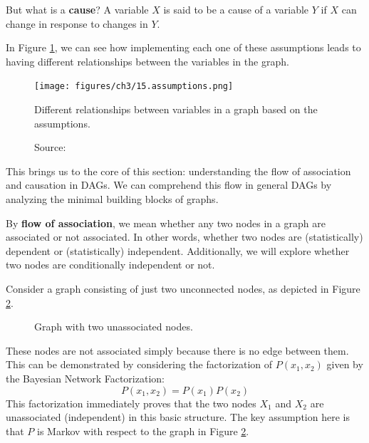 But what is a \textbf{cause}? A variable \( X \) is said to be a cause
of a variable \( Y \) if \( X \) can change in response to changes in \( Y \).

In Figure \ref{fig:assumptions}, we can see how implementing each one
of these assumptions leads to having different relationships
between the variables in the graph.

\begin{figure}[h]
    \centering
    \texttt{[image: figures/ch3/15.assumptions.png]}
    \caption{Different relationships between variables in a graph based on the assumptions.}
    \vspace{-10px}
    \caption*{\scriptsize{Source: \cite{Neal_2020a}}}
    \label{fig:assumptions}
\end{figure}

This brings us to the core of this section: understanding the flow
of association and causation in DAGs. We can comprehend this flow
in general DAGs by analyzing the minimal building blocks of graphs.

By \textbf{flow of association}, we mean whether any two nodes in
a graph are associated or not associated. In other words, whether two nodes are
(statistically) dependent or (statistically) independent.
Additionally, we will explore whether two nodes are conditionally
independent or not.

Consider a graph consisting of just two unconnected nodes,
as depicted in Figure \ref{fig:unconnected_nodes}.

\begin{figure}[h]
    \centering
    \caption{Graph with two unassociated nodes.}
    \label{fig:unconnected_nodes}
\end{figure}

These nodes are not associated simply because there is no edge between them.
This can be demonstrated by considering the factorization of \( P(x_1, x_2) \)
given by the Bayesian Network Factorization:
\[
P(x_1, x_2) = P(x_1) P(x_2)
\]
This factorization immediately proves that the two nodes
\( X_1 \) and \( X_2 \) are unassociated (independent)
in this basic structure. The key assumption here is that \( P \)
is Markov with respect to the graph in Figure \ref{fig:unconnected_nodes}.

